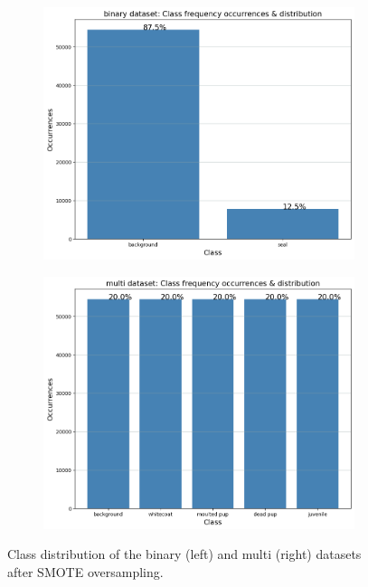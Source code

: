 \documentclass[letterpaper,12pt]{article}
\begin{document}
\begin{figure}[h]
\centering
\begin{subfigure}{.5\textwidth}
  \centering
  \includegraphics[width=\textwidth]{results/binary_class_distribution.png}
  \label{fig:binary_class_distribution_oversample}
\end{subfigure}%
\begin{subfigure}{.5\textwidth}
  \centering
  \includegraphics[width=\textwidth]{results/multi_class_distribution.png}
  \label{fig:multi_class_distribution_oversample}
\end{subfigure}
\caption{\label{fig:class_distribution_oversample}Class distribution of the binary (left) and multi (right) datasets after SMOTE oversampling.}
\end{figure}
\end{document}
